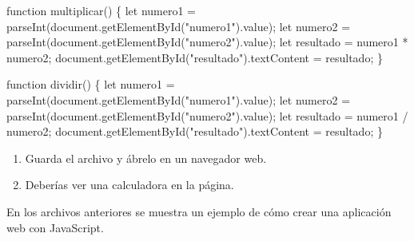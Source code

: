 \documentclass[
  a4paper,
  DIV=11,
  numbers=noendperiod,
  onepage,
  openany]{scrreprt}
\newenvironment{Shaded}{\begin{snugshade}}{\end{snugshade}}
\newcommand{\AttributeTok}[1]{\textcolor[rgb]{0.40,0.45,0.13}{#1}}
\newcommand{\BuiltInTok}[1]{\textcolor[rgb]{0.00,0.23,0.31}{#1}}
\newcommand{\FunctionTok}[1]{\textcolor[rgb]{0.28,0.35,0.67}{#1}}
\newcommand{\KeywordTok}[1]{\textcolor[rgb]{0.00,0.23,0.31}{#1}}
\newcommand{\NormalTok}[1]{\textcolor[rgb]{0.00,0.23,0.31}{#1}}
\newcommand{\OperatorTok}[1]{\textcolor[rgb]{0.37,0.37,0.37}{#1}}
\newcommand{\PreprocessorTok}[1]{\textcolor[rgb]{0.68,0.00,0.00}{#1}}
\newcommand{\StringTok}[1]{\textcolor[rgb]{0.13,0.47,0.30}{#1}}
\begin{document}
\begin{Shaded}
\begin{Highlighting}[]
\KeywordTok{function} \FunctionTok{multiplicar}\NormalTok{() \{}
    \KeywordTok{let}\NormalTok{ numero1 }\OperatorTok{=} \PreprocessorTok{parseInt}\NormalTok{(}\BuiltInTok{document}\OperatorTok{.}\FunctionTok{getElementById}\NormalTok{(}\StringTok{"numero1"}\NormalTok{)}\OperatorTok{.}\AttributeTok{value}\NormalTok{)}\OperatorTok{;}
    \KeywordTok{let}\NormalTok{ numero2 }\OperatorTok{=} \PreprocessorTok{parseInt}\NormalTok{(}\BuiltInTok{document}\OperatorTok{.}\FunctionTok{getElementById}\NormalTok{(}\StringTok{"numero2"}\NormalTok{)}\OperatorTok{.}\AttributeTok{value}\NormalTok{)}\OperatorTok{;}
    \KeywordTok{let}\NormalTok{ resultado }\OperatorTok{=}\NormalTok{ numero1 }\OperatorTok{*}\NormalTok{ numero2}\OperatorTok{;}
    \BuiltInTok{document}\OperatorTok{.}\FunctionTok{getElementById}\NormalTok{(}\StringTok{"resultado"}\NormalTok{)}\OperatorTok{.}\AttributeTok{textContent} \OperatorTok{=}\NormalTok{ resultado}\OperatorTok{;}
\NormalTok{\}}

\KeywordTok{function} \FunctionTok{dividir}\NormalTok{() \{}
    \KeywordTok{let}\NormalTok{ numero1 }\OperatorTok{=} \PreprocessorTok{parseInt}\NormalTok{(}\BuiltInTok{document}\OperatorTok{.}\FunctionTok{getElementById}\NormalTok{(}\StringTok{"numero1"}\NormalTok{)}\OperatorTok{.}\AttributeTok{value}\NormalTok{)}\OperatorTok{;}
    \KeywordTok{let}\NormalTok{ numero2 }\OperatorTok{=} \PreprocessorTok{parseInt}\NormalTok{(}\BuiltInTok{document}\OperatorTok{.}\FunctionTok{getElementById}\NormalTok{(}\StringTok{"numero2"}\NormalTok{)}\OperatorTok{.}\AttributeTok{value}\NormalTok{)}\OperatorTok{;}
    \KeywordTok{let}\NormalTok{ resultado }\OperatorTok{=}\NormalTok{ numero1 }\OperatorTok{/}\NormalTok{ numero2}\OperatorTok{;}
    \BuiltInTok{document}\OperatorTok{.}\FunctionTok{getElementById}\NormalTok{(}\StringTok{"resultado"}\NormalTok{)}\OperatorTok{.}\AttributeTok{textContent} \OperatorTok{=}\NormalTok{ resultado}\OperatorTok{;}
\NormalTok{\}}
\end{Highlighting}
\end{Shaded}

\begin{enumerate}
\def\labelenumi{\arabic{enumi}.}
\setcounter{enumi}{4}
\item
  Guarda el archivo y ábrelo en un navegador web.
\item
  Deberías ver una calculadora en la página.
\end{enumerate}

En los archivos anteriores se muestra un ejemplo de cómo crear una
aplicación web con JavaScript.
\end{document}
